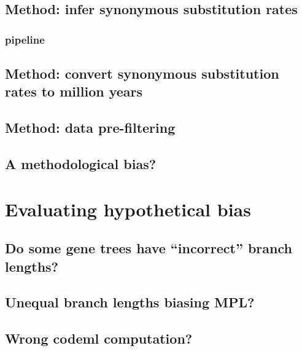 \documentclass[a4paper]{beamer}
\begin{document}
\subsection{Method: infer synonymous substitution rates}
\subsubsection{pipeline}\begin{frame}{}\end{frame}
\subsection{Method: convert synonymous substitution rates to million years}\begin{frame}{}\end{frame}
\subsection{Method: data pre-filtering}\begin{frame}{}\end{frame}
\subsection{A methodological bias?}\begin{frame}{}\end{frame}

\section{Evaluating hypothetical bias}
\subsection{Do some gene trees have ``incorrect'' branch lengths?}\begin{frame}{}\end{frame}
\subsection{Unequal branch lengths biasing MPL?}\begin{frame}{}\end{frame}
\subsection{Wrong codeml computation?}\begin{frame}{}\end{frame}
\end{document}
